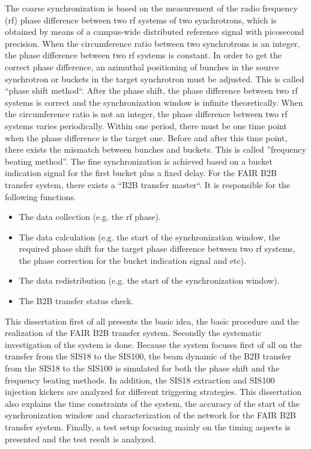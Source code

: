 The coarse synchronization is based on the measurement of the radio frequency (rf) phase difference between two rf systems of two synchrotrons, which is obtained by means of a campus-wide distributed reference signal with picosecond precision. When the circumference ratio between two synchrotrons is an integer, the phase difference between two rf systems is constant. In order to get the correct phase difference, an azimuthal positioning of bunches in the source synchrotron or buckets in the target synchrotron must be adjusted. This is called “phase shift method“. After the phase shift, the phase difference between two rf systems is correct and the synchronization window is infinite theoretically. When the circumference ratio is not an integer, the phase difference between two rf systems varies periodically. Within one period, there must be one time point when the phase difference is the target one. Before and after this time point, there exists the mismatch between bunches and buckets. This is called ”frequency beating method”. The fine synchronization is achieved based on a bucket indication signal for the first bucket plus a fixed delay. For the FAIR B2B transfer system, there exists a “B2B transfer master“. It is responsible for the following functions. 
\begin{itemize}

	\item 	The data collection (e.g. the rf phase). 
   \item 	The data calculation (e.g. the start of the synchronization window, the required phase shift for the target phase difference between two rf systems, the phase correction for the bucket indication signal and etc). 
   \item 	The data redistribution (e.g. the start of the synchronization window).
	\item The B2B transfer status check.
\end{itemize}

This dissertation first of all presents the basic idea, the basic procedure and the realization of the FAIR B2B transfer system. Secondly the systematic investigation of the system is done. Because the system focuses first of all on the transfer from the SIS18 to the SIS100, the beam dynamic of the B2B transfer from the SIS18 to the SIS100 is simulated for both the phase shift and the frequency beating methods. In addition, the SIS18 extraction and SIS100 injection kickers are analyzed for different triggering strategies. This dissertation also explains the time constraints of the system, the accuracy of the start of the synchronization window and characterization of the network for the FAIR B2B transfer system. Finally, a test setup focusing mainly on the timing aspects is presented and the test result is analyzed. 
